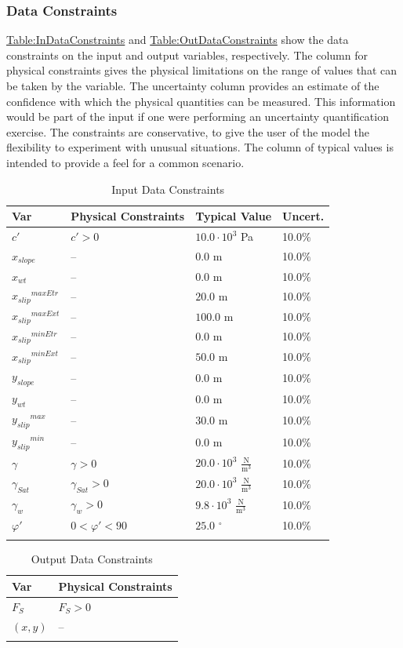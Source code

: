 \documentclass[12pt]{article}
\begin{document}
\subsubsection{Data Constraints}
\label{Sec:DataConstraints}
\hyperref[Table:InDataConstraints]{Table:InDataConstraints} and \hyperref[Table:OutDataConstraints]{Table:OutDataConstraints} show the data constraints on the input and output variables, respectively. The column for physical constraints gives the physical limitations on the range of values that can be taken by the variable. The uncertainty column provides an estimate of the confidence with which the physical quantities can be measured. This information would be part of the input if one were performing an uncertainty quantification exercise. The constraints are conservative, to give the user of the model the flexibility to experiment with unusual situations. The column of typical values is intended to provide a feel for a common scenario.
\begin{longtable}{l l l l}
\toprule
Var & Physical Constraints & Typical Value & Uncert.
\\
\midrule
\endhead
$c'$ & $c'>0$ & $10.0\cdot{}10^{3}$ Pa & 10.0$\%$
\\
${x_{slope}}$ & -- & $0.0$ m & 10.0$\%$
\\
${x_{wt}}$ & -- & $0.0$ m & 10.0$\%$
\\
${{x_{slip}}^{maxEtr}}$ & -- & $20.0$ m & 10.0$\%$
\\
${{x_{slip}}^{maxExt}}$ & -- & $100.0$ m & 10.0$\%$
\\
${{x_{slip}}^{minEtr}}$ & -- & $0.0$ m & 10.0$\%$
\\
${{x_{slip}}^{minExt}}$ & -- & $50.0$ m & 10.0$\%$
\\
${y_{slope}}$ & -- & $0.0$ m & 10.0$\%$
\\
${y_{wt}}$ & -- & $0.0$ m & 10.0$\%$
\\
${{y_{slip}}^{max}}$ & -- & $30.0$ m & 10.0$\%$
\\
${{y_{slip}}^{min}}$ & -- & $0.0$ m & 10.0$\%$
\\
$γ$ & $γ>0$ & $20.0\cdot{}10^{3}$ $\frac{\text{N}}{\text{m}^{3}}$ & 10.0$\%$
\\
${γ_{Sat}}$ & ${γ_{Sat}}>0$ & $20.0\cdot{}10^{3}$ $\frac{\text{N}}{\text{m}^{3}}$ & 10.0$\%$
\\
${γ_{w}}$ & ${γ_{w}}>0$ & $9.8\cdot{}10^{3}$ $\frac{\text{N}}{\text{m}^{3}}$ & 10.0$\%$
\\
$φ'$ & $0<φ'<90$ & $25.0$ ${}^{\circ}$ & 10.0$\%$
\\
\bottomrule
\caption{Input Data Constraints}
\label{Table:InDataConstraints}
\end{longtable}
\begin{longtable}{l l}
\toprule
Var & Physical Constraints
\\
\midrule
\endhead
${F_{S}}$ & ${F_{S}}>0$
\\
$(x,y)$ & --
\\
\bottomrule
\caption{Output Data Constraints}
\label{Table:OutDataConstraints}
\end{longtable}
\end{document}
